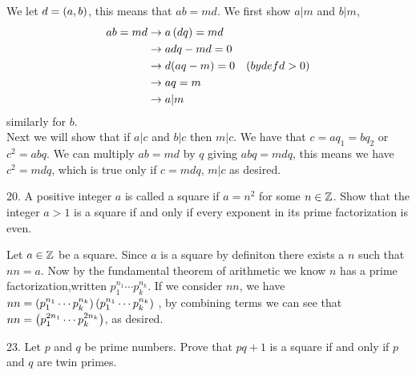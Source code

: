 \begin{mdframed}[style=darkAnswer,frametitle={Joe Starr}]
  We let $d=\left(a,b\right)$, this means that $ab=md$. We first show $a|m$ and $b|m$,
  \begin{align*}
    ab=md & \rightarrow a\left(dq\right)=md                \\
          & \rightarrow adq-md=0                    \\
          & \rightarrow d(aq-m)=0    & (by def d>0) \\
          & \rightarrow aq=m                        \\
          & \rightarrow a|m                         \\
  \end{align*}
  similarly for  $b$. \\
  Next we will show that if $a|c$ and $b|c$ then $m|c$. We have that $c=aq_1=bq_2$
  or $c^2=abq$. We can multiply $ab=md$ by $q$ giving $abq=mdq$, this means we
  have $c^2=mdq$, which is true only if $c=mdq$, $m|c$ as desired.
\end{mdframed}
\newpage
\begin{mdframed}[style=darkQuesion]
  20. A positive integer $a$ is called a square if $a=n^2$ for some $n\in \mathbb{Z}$.
  Show that the integer $a>1$ is a square if and only if every exponent in its
  prime factorization is even.
\end{mdframed}

\begin{mdframed}[style=darkAnswer,frametitle={Joe Starr}]
  Let $a\in \mathbb{Z}$ be a square. Since $a$ is a square by definiton there exists
  a $n$ such that $nn=a$. Now by the fundamental theorem of arithmetic we know $n$
  has a prime factorization,written $p_1^{n_1}\cdots p_k^{n_k}$. If we consider
  $nn$, we have $nn = \left(p_1^{n_1}\cdots p_k^{n_k}\right)
    \left(p_1^{n_1}\cdots p_k^{n_k}\right)$
  , by combining terms we can see that $nn= \left(p_1^{2n_1}\cdots p_k^{2n_k}\right)$, as
  desired.
\end{mdframed}
\newpage
\begin{mdframed}[style=darkQuesion]
  23. Let $p$ and $q$ be prime numbers. Prove that $pq+1$ is a square if and only
  if $p$ and $q$ are twin primes.
\end{mdframed}

